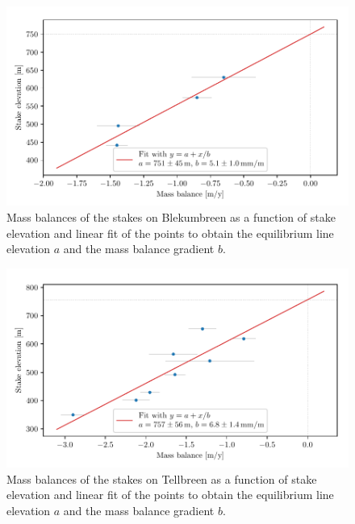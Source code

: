 \begin{figure}[H]
    \centering
    \includegraphics[width=\textwidth]{./figs/Elevation_Blekumbreen_mbg.pdf}
    \caption{Mass balances of the stakes on Blekumbreen as a function of stake elevation and linear fit of the points to obtain
    the equilibrium line elevation $a$ and the mass balance gradient $b$.}
    \label{GPS:fig:elev_ble_mbg}
\end{figure}


\begin{figure}[h]
    \centering
    \includegraphics[width=\textwidth]{./figs/Elevation_Tellbreen_mbg.pdf}
    \caption{Mass balances of the stakes on Tellbreen as a function of stake elevation and linear fit of the points to obtain
    the equilibrium line elevation $a$ and the mass balance gradient $b$.}
    \label{GPS:fig:elev_tel_mbg}
\end{figure}



